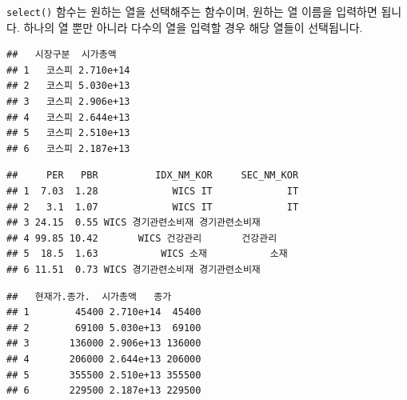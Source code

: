 \documentclass[12pt,]{book}
\newenvironment{Shaded}{\begin{snugshade}}{\end{snugshade}}
\newcommand{\KeywordTok}[1]{\textcolor[rgb]{0.13,0.29,0.53}{\textbf{#1}}}
\newcommand{\NormalTok}[1]{#1}
\newcommand{\OperatorTok}[1]{\textcolor[rgb]{0.81,0.36,0.00}{\textbf{#1}}}
\newcommand{\StringTok}[1]{\textcolor[rgb]{0.31,0.60,0.02}{#1}}
\begin{document}
\texttt{select()} 함수는 원하는 열을 선택해주는 함수이며, 원하는 열 이름을 입력하면 됩니다. 하나의 열 뿐만 아니라 다수의 열을 입력할 경우 해당 열들이 선택됩니다.

\begin{Shaded}
\end{Shaded}

\begin{verbatim}
##   시장구분  시가총액
## 1   코스피 2.710e+14
## 2   코스피 5.030e+13
## 3   코스피 2.906e+13
## 4   코스피 2.644e+13
## 5   코스피 2.510e+13
## 6   코스피 2.187e+13
\end{verbatim}

\begin{Shaded}
\end{Shaded}

\begin{verbatim}
##     PER   PBR          IDX_NM_KOR     SEC_NM_KOR
## 1  7.03  1.28             WICS IT             IT
## 2   3.1  1.07             WICS IT             IT
## 3 24.15  0.55 WICS 경기관련소비재 경기관련소비재
## 4 99.85 10.42       WICS 건강관리       건강관리
## 5  18.5  1.63           WICS 소재           소재
## 6 11.51  0.73 WICS 경기관련소비재 경기관련소비재
\end{verbatim}

\begin{Shaded}
\end{Shaded}

\begin{verbatim}
##   현재가.종가.  시가총액   종가
## 1        45400 2.710e+14  45400
## 2        69100 5.030e+13  69100
## 3       136000 2.906e+13 136000
## 4       206000 2.644e+13 206000
## 5       355500 2.510e+13 355500
## 6       229500 2.187e+13 229500
\end{verbatim}
\end{document}

